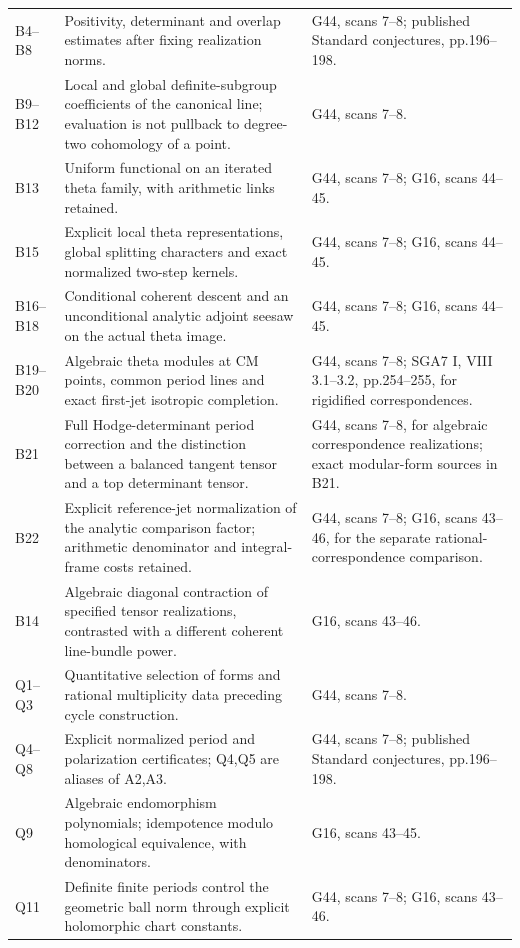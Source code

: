 \begin{longtable}{@{}p{.18\linewidth}p{.48\linewidth}p{.27\linewidth}@{}}
B4--B8 & Positivity, determinant and overlap estimates after fixing realization norms. & G44, scans 7--8; published Standard conjectures, pp.196--198.\\
B9--B12 & Local and global definite-subgroup coefficients of the canonical line; evaluation is not pullback to degree-two cohomology of a point. & G44, scans 7--8.\\
B13 & Uniform functional on an iterated theta family, with arithmetic links retained. & G44, scans 7--8; G16, scans 44--45.\\
B15 & Explicit local theta representations, global splitting characters and exact normalized two-step kernels. & G44, scans 7--8; G16, scans 44--45.\\
B16--B18 & Conditional coherent descent and an unconditional analytic adjoint seesaw on the actual theta image. & G44, scans 7--8; G16, scans 44--45.\\
B19--B20 & Algebraic theta modules at CM points, common period lines and exact first-jet isotropic completion. & G44, scans 7--8; SGA7 I, VIII 3.1--3.2, pp.254--255, for rigidified correspondences.\\
B21 & Full Hodge-determinant period correction and the distinction between a balanced tangent tensor and a top determinant tensor. & G44, scans 7--8, for algebraic correspondence realizations; exact modular-form sources in B21.\\
B22 & Explicit reference-jet normalization of the analytic comparison factor; arithmetic denominator and integral-frame costs retained. & G44, scans 7--8; G16, scans 43--46, for the separate rational-correspondence comparison.\\
B14 & Algebraic diagonal contraction of specified tensor realizations, contrasted with a different coherent line-bundle power. & G16, scans 43--46.\\
Q1--Q3 & Quantitative selection of forms and rational multiplicity data preceding cycle construction. & G44, scans 7--8.\\
Q4--Q8 & Explicit normalized period and polarization certificates; Q4,Q5 are aliases of A2,A3. & G44, scans 7--8; published Standard conjectures, pp.196--198.\\
Q9 & Algebraic endomorphism polynomials; idempotence modulo homological equivalence, with denominators. & G16, scans 43--45.\\
Q11 & Definite finite periods control the geometric ball norm through explicit holomorphic chart constants. & G44, scans 7--8; G16, scans 43--46.\\

\end{longtable}
